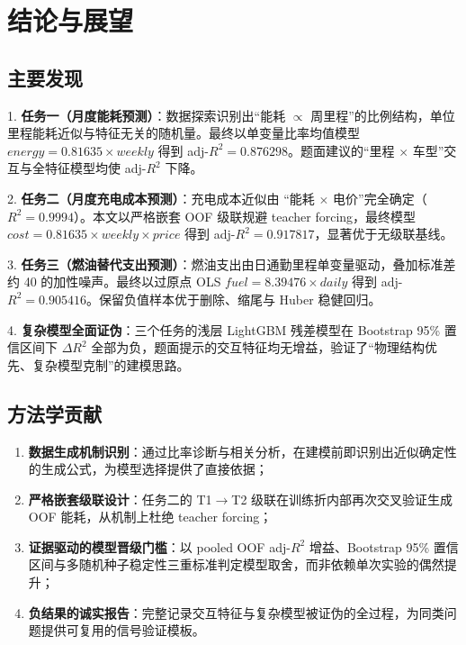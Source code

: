 \section{结论与展望}

\subsection{主要发现}

1. \textbf{任务一（月度能耗预测）}：数据探索识别出``能耗 $\propto$ 周里程''的比例结构，单位里程能耗近似与特征无关的随机量。最终以单变量比率均值模型 $energy = 0.81635 \times weekly$ 得到 adj-$R^2=0.876298$。题面建议的``里程 $\times$ 车型''交互与全特征模型均使 adj-$R^2$ 下降。

2. \textbf{任务二（月度充电成本预测）}：充电成本近似由 ``能耗 $\times$ 电价''完全确定（$R^2=0.9994$）。本文以严格嵌套 OOF 级联规避 teacher forcing，最终模型 $cost = 0.81635 \times weekly \times price$ 得到 adj-$R^2=0.917817$，显著优于无级联基线。

3. \textbf{任务三（燃油替代支出预测）}：燃油支出由日通勤里程单变量驱动，叠加标准差约 40 的加性噪声。最终以过原点 OLS $fuel = 8.39476 \times daily$ 得到 adj-$R^2=0.905416$。保留负值样本优于删除、缩尾与 Huber 稳健回归。

4. \textbf{复杂模型全面证伪}：三个任务的浅层 LightGBM 残差模型在 Bootstrap 95\% 置信区间下 $\Delta R^2$ 全部为负，题面提示的交互特征均无增益，验证了``物理结构优先、复杂模型克制''的建模思路。

\subsection{方法学贡献}

\begin{enumerate}[itemsep=0pt]
\item \textbf{数据生成机制识别}：通过比率诊断与相关分析，在建模前即识别出近似确定性的生成公式，为模型选择提供了直接依据；
\item \textbf{严格嵌套级联设计}：任务二的 T1$\to$T2 级联在训练折内部再次交叉验证生成 OOF 能耗，从机制上杜绝 teacher forcing；
\item \textbf{证据驱动的模型晋级门槛}：以 pooled OOF adj-$R^2$ 增益、Bootstrap 95\% 置信区间与多随机种子稳定性三重标准判定模型取舍，而非依赖单次实验的偶然提升；
\item \textbf{负结果的诚实报告}：完整记录交互特征与复杂模型被证伪的全过程，为同类问题提供可复用的信号验证模板。
\end{enumerate}


